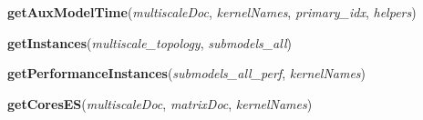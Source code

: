     \label{models:getAuxModelTime}

    \vspace{0.5ex}

\hspace{.8\funcindent}\begin{boxedminipage}{\funcwidth}

    \raggedright \textbf{getAuxModelTime}(\textit{multiscaleDoc}, \textit{kernelNames}, \textit{primary\_idx}, \textit{helpers})

\setlength{\parskip}{2ex}
\setlength{\parskip}{1ex}
    \end{boxedminipage}

    \label{models:getInstances}

    \vspace{0.5ex}

\hspace{.8\funcindent}\begin{boxedminipage}{\funcwidth}

    \raggedright \textbf{getInstances}(\textit{multiscale\_topology}, \textit{submodels\_all})

\setlength{\parskip}{2ex}
\setlength{\parskip}{1ex}
    \end{boxedminipage}

    \label{models:getPerformanceInstances}

    \vspace{0.5ex}

\hspace{.8\funcindent}\begin{boxedminipage}{\funcwidth}

    \raggedright \textbf{getPerformanceInstances}(\textit{submodels\_all\_perf}, \textit{kernelNames})

\setlength{\parskip}{2ex}
\setlength{\parskip}{1ex}
    \end{boxedminipage}

    \label{models:getCoresES}

    \vspace{0.5ex}

\hspace{.8\funcindent}\begin{boxedminipage}{\funcwidth}

    \raggedright \textbf{getCoresES}(\textit{multiscaleDoc}, \textit{matrixDoc}, \textit{kernelNames})

\setlength{\parskip}{2ex}
\setlength{\parskip}{1ex}
    \end{boxedminipage}

